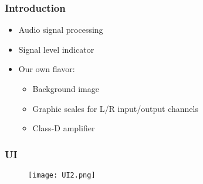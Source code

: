 
\begin{frame}
	\frametitle{Introduction}
		\begin{itemize}
			\item Audio signal processing
			\item 	Signal level indicator	
			\item Our own flavor:
				\begin{itemize}
				\item Background image
				\item Graphic scales for L/R input/output channels
				\item Class-D amplifier
			\end{itemize}
		\end{itemize}
\end{frame}





\begin{frame}
	\frametitle{UI}
	  \begin{figure}[h]
    \centering 
    \texttt{[image: UI2.png]} 
       \label{UI}
  \end{figure}
\end{frame}


